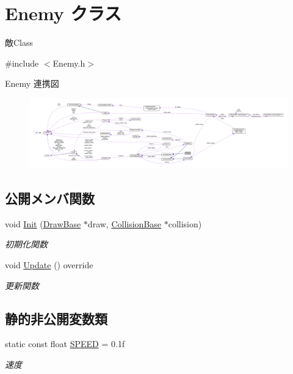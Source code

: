 \hypertarget{class_enemy}{}\section{Enemy クラス}
\label{class_enemy}


敵\+Class  




{\ttfamily \#include $<$Enemy.\+h$>$}



Enemy 連携図\nopagebreak
\begin{figure}[H]
\begin{center}
\leavevmode
\includegraphics[width=350pt]{class_enemy__coll__graph}
\end{center}
\end{figure}
\subsection*{公開メンバ関数}
\begin{DoxyCompactItemize}
\item 
void \mbox{\hyperlink{class_enemy_a3150c4d6c741494eda76bd59e9ed751b}{Init}} (\mbox{\hyperlink{class_draw_base}{Draw\+Base}} $\ast$draw, \mbox{\hyperlink{class_collision_base}{Collision\+Base}} $\ast$collision)
\begin{DoxyCompactList}\small\item\em 初期化関数 \end{DoxyCompactList}\item 
void \mbox{\hyperlink{class_enemy_a614ad271f07ecf63cb3e665155b7e258}{Update}} () override
\begin{DoxyCompactList}\small\item\em 更新関数 \end{DoxyCompactList}\end{DoxyCompactItemize}
\subsection*{静的非公開変数類}
\begin{DoxyCompactItemize}
\item 
static const float \mbox{\hyperlink{class_enemy_aeed9db9b2062bfa87f2b77462dc47ba5}{S\+P\+E\+ED}} = 0.\+1f
\begin{DoxyCompactList}\small\item\em 速度 \end{DoxyCompactList}\end{DoxyCompactItemize}
